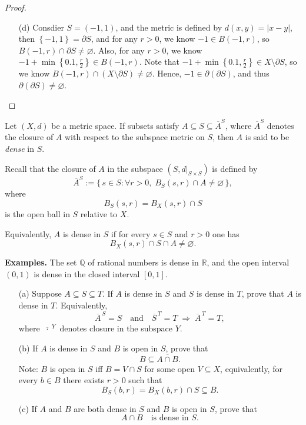 \begin{proof}
\begin{itemize}
    \item [(d)] Consdier \(S = (-1, 1)\), and the metric is defined by \(d(x,y) = \vert x-y \vert \), then \(\left\{ -1, 1 \right\} = \partial S\), and for any \(r > 0\), we know \(-1 \in B(-1, r)\), so \(B(-1, r) \cap \partial S \neq \varnothing \). Also, for any \(r > 0\), we know \(-1 + \min \left\{ 0.1, \frac{r}{2} \right\} \in B(-1, r)\). Note that \(-1 + \min \left\{ 0.1, \frac{r}{2} \right\} \in X\setminus \partial S\), so we know \(B(-1, r) \cap (X\setminus \partial S) \neq \varnothing \). Hence, \(-1 \in \partial (\partial S)\), and thus \(\partial (\partial S) \neq \varnothing \).           
  \end{itemize}
\end{proof}
\begin{problem}[21 pts]
    Let $(X,d)$ be a metric space.  
If subsets satisfy $A \subseteq S \subseteq \overline{A}^S$,  
where $\overline{A}^S$ denotes the closure of $A$ with respect to the subspace metric on $S$,  
then $A$ is said to be \emph{dense} in $S$.  

Recall that the closure of $A$ in the subspace $(S,d|_{S\times S})$ is defined by
\[
\overline{A}^S := \{\, s \in S : \forall r>0,\; B_S(s,r)\cap A \neq \varnothing \,\},
\]
where
\[
B_S(s,r) = B_X(s,r)\cap S
\]
is the open ball in $S$ relative to $X$.  

Equivalently, $A$ is dense in $S$ if for every $s\in S$ and $r>0$ one has
\[
B_X(s,r)\cap S \cap A \neq \varnothing.
\]

\medskip
\noindent
\textbf{Examples.}  
The set $\mathbb{Q}$ of rational numbers is dense in $\mathbb{R}$,  
and the open interval $(0,1)$ is dense in the closed interval $[0,1]$.

\begin{enumerate}
  \item[(a)] Suppose $A \subseteq S \subseteq T$.  
  If $A$ is dense in $S$ and $S$ is dense in $T$, prove that $A$ is dense in $T$.  
  Equivalently,
  \[
  \overline{A}^{\,S}=S 
  \quad\text{and}\quad 
  \overline{S}^{\,T}=T
  \;\Longrightarrow\;
  \overline{A}^{\,T}=T,
  \]
  where $\overline{\;\cdot\;}^{\,Y}$ denotes closure in the subspace $Y$.

  \item[(b)] If $A$ is dense in $S$ and $B$ is open in $S$, prove that
  \[
  B \subseteq \overline{A \cap B}.
  \]
  Note: $B$ is open in $S$ iff $B=V\cap S$ for some open $V \subseteq X$,  
  equivalently, for every $b \in B$ there exists $r>0$ such that
  \[
  B_S(b,r) = B_X(b,r)\cap S \subseteq B.
  \]

  \item[(c)] If $A$ and $B$ are both dense in $S$ and $B$ is open in $S$, prove that
  \[
  A \cap B \quad \text{is dense in } S.
  \]
\end{enumerate}  

\end{problem}
